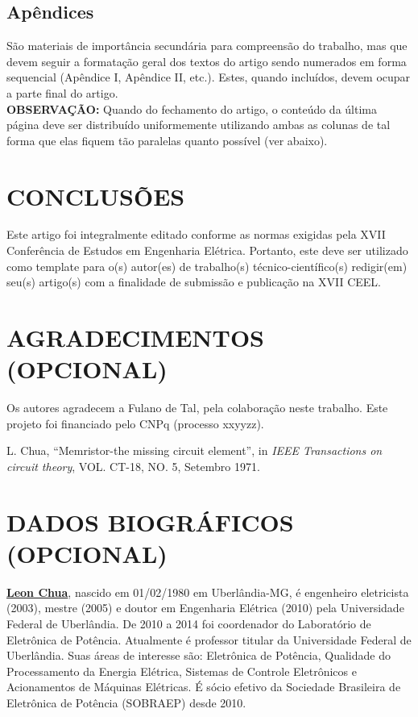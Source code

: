 \documentclass{ceel}
\begin{document}
\begin{multicols}{2}
\subsection{Apêndices}
São materiais de importância secundária para compreensão do trabalho, mas que devem seguir a formatação geral dos textos do artigo sendo numerados em forma sequencial (Apêndice I, Apêndice II, etc.). Estes, quando incluídos, devem ocupar a parte final do artigo.\\

\textbf{OBSERVAÇÃO: }Quando do fechamento do artigo, o conteúdo da última página deve ser distribuído uniformemente utilizando ambas as colunas de tal forma que elas fiquem tão paralelas quanto possível (ver abaixo).
\section{CONCLUSÕES}
Este artigo foi integralmente editado conforme as normas exigidas pela XVII Conferência de Estudos em Engenharia Elétrica. Portanto, este deve ser utilizado como template para o(s) autor(es) de trabalho(s) técnico-científico(s) redigir(em) seu(s) artigo(s) com a finalidade de submissão e publicação na XVII CEEL.
\section*{ AGRADECIMENTOS (OPCIONAL)}
Os autores agradecem a Fulano de Tal, pela colaboração neste trabalho. Este projeto foi financiado pelo CNPq (processo xxyyzz).
\begin{thebibliography}{9} %

    L. Chua,
    “Memristor-the missing circuit element”, 
    in \emph{IEEE Transactions on circuit theory}, VOL. CT-18, NO. 5, Setembro 1971.
   


\end{thebibliography}

\section*{DADOS BIOGRÁFICOS (OPCIONAL)}
\noindent \underline{\textbf{Leon Chua}}, nascido em 01/02/1980 em Uberlândia-MG, é engenheiro eletricista (2003), mestre (2005) e doutor em Engenharia Elétrica (2010) pela Universidade Federal de Uberlândia. De 2010 a 2014 foi coordenador do Laboratório de Eletrônica de Potência. Atualmente é professor titular da Universidade Federal de Uberlândia. Suas áreas de interesse são: Eletrônica de Potência, Qualidade do Processamento da Energia Elétrica, Sistemas de Controle Eletrônicos e Acionamentos de Máquinas Elétricas. É sócio efetivo da Sociedade Brasileira de Eletrônica de Potência (SOBRAEP) desde 2010.


\end{multicols}
\end{document}
